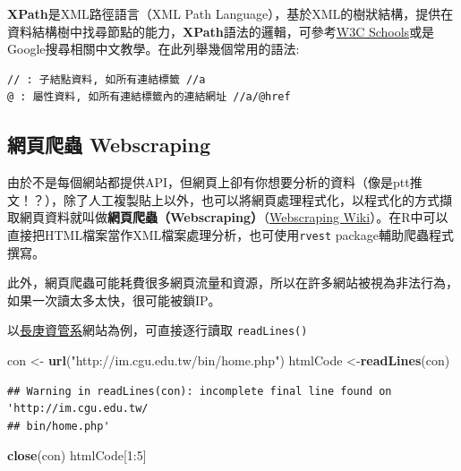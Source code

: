 \documentclass[]{book}
\newenvironment{Shaded}{\begin{snugshade}}{\end{snugshade}}
\newcommand{\KeywordTok}[1]{\textcolor[rgb]{0.13,0.29,0.53}{\textbf{{#1}}}}
\newcommand{\DecValTok}[1]{\textcolor[rgb]{0.00,0.00,0.81}{{#1}}}
\newcommand{\StringTok}[1]{\textcolor[rgb]{0.31,0.60,0.02}{{#1}}}
\newcommand{\NormalTok}[1]{{#1}}
\theoremstyle{definition}
\theoremstyle{definition}
\theoremstyle{remark}
\begin{document}
\textbf{XPath}是XML路徑語言（XML Path
Language），基於XML的樹狀結構，提供在資料結構樹中找尋節點的能力，\textbf{XPath}語法的邏輯，可參考\href{https://www.w3schools.com/xml/xpath_syntax.asp}{W3C
Schools}或是Google搜尋相關中文教學。在此列舉幾個常用的語法:

\begin{verbatim}
// : 子結點資料, 如所有連結標籤 //a
@ : 屬性資料, 如所有連結標籤內的連結網址 //a/@href
\end{verbatim}

\subsection{網頁爬蟲 Webscraping}\label{-webscraping}

由於不是每個網站都提供API，但網頁上卻有你想要分析的資料（像是ptt推文！？），除了人工複製貼上以外，也可以將網頁處理程式化，以程式化的方式擷取網頁資料就叫做\textbf{網頁爬蟲（Webscraping）}（\href{http://en.wikipedia.org/wiki/Web_scraping}{Webscraping
Wiki}）。在R中可以直接把HTML檔案當作XML檔案處理分析，也可使用\texttt{rvest}\citep{R-rvest}
package輔助爬蟲程式撰寫。

此外，網頁爬蟲可能耗費很多網頁流量和資源，所以在許多網站被視為非法行為，如果一次讀太多太快，很可能被鎖IP。

以\href{http://im.cgu.edu.tw/bin/home.php}{長庚資管系}網站為例，可直接逐行讀取
\texttt{readLines()}

\begin{Shaded}
\begin{Highlighting}[]
\NormalTok{con <-}\StringTok{ }\KeywordTok{url}\NormalTok{(}\StringTok{"http://im.cgu.edu.tw/bin/home.php"}\NormalTok{)}
\NormalTok{htmlCode <-}\KeywordTok{readLines}\NormalTok{(con)}
\end{Highlighting}
\end{Shaded}

\begin{verbatim}
## Warning in readLines(con): incomplete final line found on 'http://im.cgu.edu.tw/
## bin/home.php'
\end{verbatim}

\begin{Shaded}
\begin{Highlighting}[]
\KeywordTok{close}\NormalTok{(con)}
\NormalTok{htmlCode[}\DecValTok{1}\NormalTok{:}\DecValTok{5}\NormalTok{]}
\end{Highlighting}
\end{Shaded}
\end{document}
